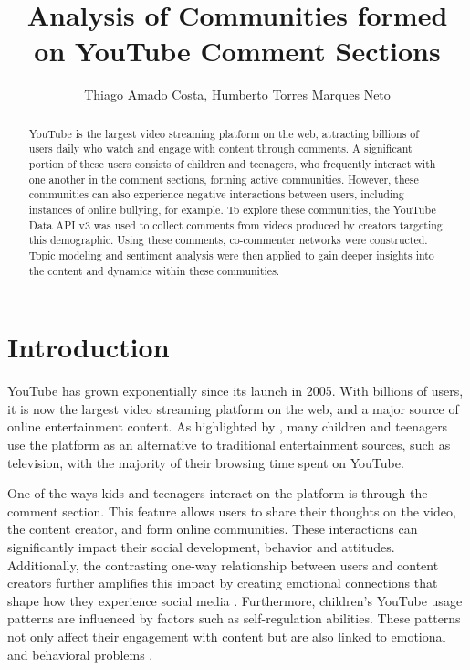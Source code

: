 \documentclass[12pt]{article}
\title{Analysis of Communities formed on YouTube Comment Sections}
\author{Thiago Amado Costa\inst{1}, Humberto Torres Marques Neto\inst{1}}
\begin{document}
\maketitle

\begin{abstract}
    YouTube is the largest video streaming platform on the web, attracting billions of users 
    daily who watch and engage with content through comments. 
    A significant portion of these users consists of children and teenagers, who frequently interact 
    with one another in the comment sections, forming active communities. 
    However, these communities can also experience negative interactions between users, 
    including instances of online bullying, for example.
    To explore these communities, the YouTube Data API v3 was used to collect comments 
    from videos produced by creators targeting this demographic. Using these comments, co-commenter
    networks were constructed.
    Topic modeling and sentiment analysis were then applied to gain deeper insights into the  
    content and dynamics within these communities.
\end{abstract}

\section{Introduction}

YouTube has grown exponentially since its launch in 2005. With billions of users, it is now the 
largest video streaming platform on the web, and a major source of online entertainment content. 
As highlighted by \cite{app13064044}, many children and teenagers use the platform as an alternative to 
traditional entertainment sources, such as television, with the majority of their 
browsing time spent on YouTube. 

One of the ways kids and teenagers interact on the platform is through the comment section. 
This feature allows users to share their thoughts on the video, the content creator, and form online 
communities. These interactions can significantly impact their social development, behavior and 
attitudes. Additionally, the contrasting one-way relationship between users and content creators 
further amplifies this impact by creating emotional connections that shape how they experience social
media \cite{lozano2023social}. 
Furthermore, children's YouTube usage patterns are influenced by factors such as self-regulation 
abilities. These patterns not only affect their engagement with content but are also linked to 
emotional and behavioral problems \cite{kim2024temperament} .
\end{document}
